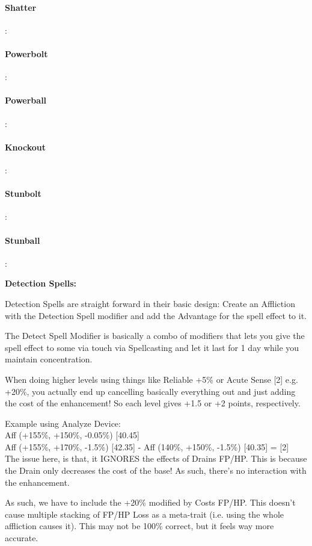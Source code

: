 \begin{multicols*}{2}
	\paragraph{Shatter}:
	\paragraph{Powerbolt}:
	\paragraph{Powerball}:
	\paragraph{Knockout}:
	\paragraph{Stunbolt}:
	\paragraph{Stunball}:
	
	\textbf{Detection Spells:\\}
	
	Detection Spells are straight forward in their basic design: Create an Affliction with the Detection Spell modifier and add the Advantage for the spell effect to it.
	
	The Detect Spell Modifier is basically a combo of modifiers that lets you give the spell effect to some via touch via Spellcasting and let it last for 1 day while you maintain concentration.
	
	When doing higher levels using things like Reliable +5\% or Acute Sense [2] e.g. +20\%, you actually end up cancelling basically everything out and just adding the cost of the enhancement! So each level gives +1.5 or +2 points, respectively.
	
	Example using Analyze Device:\\
	Aff (+155\%, +150\%, -0.05\%) [40.45]\\
	Aff (+155\%, +170\%, -1.5\%) [42.35] - Aff (140\%, +150\%, -1.5\%) [40.35] = [2]\\
	
	The issue here, is that, it IGNORES the effects of Drains FP/HP. This is because the Drain only decreases the cost of the base! As such, there's no interaction with the enhancement.
	
	As such, we have to include the +20\% modified by Costs FP/HP. This doesn't cause multiple stacking of FP/HP Loss as a meta-trait (i.e. using the whole affliction causes it). This may not be 100\% correct, but it feels way more accurate.
	

\end{multicols*}
